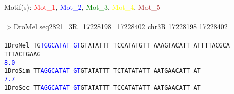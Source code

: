 \documentclass[11pt,twoside,reqno,a4paper]{article}
\begin{document}
\noindent
\newlength{\charwidth}Motif(s): \textcolor{Red}{Mot\_1}, \textcolor{Blue}{Mot\_2}, \textcolor{Green}{Mot\_3}, \textcolor{Yellow}{Mot\_4}, \textcolor{Brown}{Mot\_5}\\
\\
$>$DroMel	seq2821\_3R\_17228198\_17228402	chr3R	17228198	17228402 \\
 \\
\texttt{1\hspace*{3\charwidth}DroMel	TG\textcolor{Blue}{T}\textcolor{Blue}{G}\textcolor{Blue}{G}\textcolor{Blue}{C}\textcolor{Blue}{A}\textcolor{Blue}{T}\textcolor{Blue}{A}\textcolor{Blue}{T}	\textcolor{Blue}{G}\textcolor{Blue}{T}GTATATTT	TCCATATGTT	AAAGTACATT	ATTTTACGCA	TTTACTGAAG	\\
\hspace*{4\charwidth}\hspace*{7\charwidth}\hspace*{2\charwidth}\textcolor{Blue}{8.0}\hspace*{1\charwidth}\hspace*{1\charwidth}\hspace*{1\charwidth}\hspace*{1\charwidth}\hspace*{1\charwidth}\hspace*{1\charwidth}\\
1\hspace*{3\charwidth}DroSim	TT\textcolor{Blue}{A}\textcolor{Blue}{G}\textcolor{Blue}{G}\textcolor{Blue}{C}\textcolor{Blue}{A}\textcolor{Blue}{T}\textcolor{Blue}{A}\textcolor{Blue}{T}	\textcolor{Blue}{G}\textcolor{Blue}{T}GTATATTT	TCTATATATT	AATGAACATT	AT--------	----------	\\
\hspace*{4\charwidth}\hspace*{7\charwidth}\hspace*{2\charwidth}\textcolor{Blue}{7.7}\hspace*{1\charwidth}\hspace*{1\charwidth}\hspace*{1\charwidth}\hspace*{1\charwidth}\hspace*{1\charwidth}\hspace*{1\charwidth}\\
1\hspace*{3\charwidth}DroSec	TT\textcolor{Blue}{A}\textcolor{Blue}{G}\textcolor{Blue}{G}\textcolor{Blue}{C}\textcolor{Blue}{A}\textcolor{Blue}{T}\textcolor{Blue}{A}\textcolor{Blue}{T}	\textcolor{Blue}{G}\textcolor{Blue}{T}GTATATTT	TCCATATATT	AATGAACATT	AT--------	----------	\\
}
\end{document}
